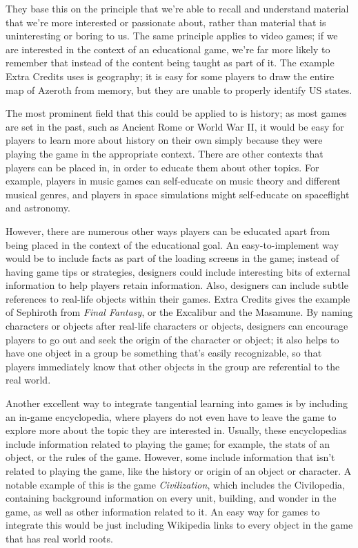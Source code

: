 \documentclass[12pt]{report}
\begin{document}
		They base this on the principle that we're able to recall and understand material that we're more interested or passionate about, rather than material that is uninteresting or boring to us. The same principle applies to video games; if we are interested in the context of an educational game, we're far more likely to remember that instead of the content being taught as part of it. The example Extra Credits uses is geography; it is easy for some players to draw the entire map of Azeroth from memory, but they are unable to properly identify US states.
		
		The most prominent field that this could be applied to is history; as most games are set in the past, such as Ancient Rome or World War II, it would be easy for players to learn more about history on their own simply because they were playing the game in the appropriate context. There are other contexts that players can be placed in, in order to educate them about other topics. For example, players in music games can self-educate on music theory and different musical genres, and players in space simulations might self-educate on spaceflight and astronomy. 
		
		However, there are numerous other ways players can be educated apart from being placed in the context of the educational goal. An easy-to-implement way would be to include facts as part of the loading screens in the game; instead of having game tips or strategies, designers could include interesting bits of external information to help players retain information. Also, designers can include subtle references to real-life objects within their games. Extra Credits gives the example of Sephiroth from \textit{Final Fantasy}, or the Excalibur and the Masamune. By naming characters or objects after real-life characters or objects, designers can encourage players to go out and seek the origin of the character or object; it also helps to have one object in a group be something that's easily recognizable, so that players immediately know that other objects in the group are referential to the real world.
		
		Another excellent way to integrate tangential learning into games is by including an in-game encyclopedia, where players do not even have to leave the game to explore more about the topic they are interested in. Usually, these encyclopedias include information related to playing the game; for example, the stats of an object, or the rules of the game. However, some include information that isn't related to playing the game, like the history or origin of an object or character. A notable example of this is the game \textit{Civilization}, which includes the Civilopedia, containing background information on every unit, building, and wonder in the game, as well as other information related to it. An easy way for games to integrate this would be just including Wikipedia links to every object in the game that has real world roots.
	
\end{document}
